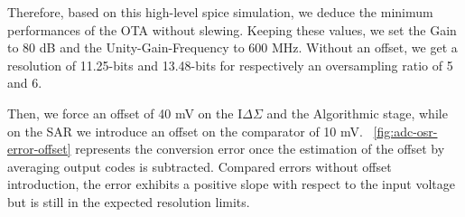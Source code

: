 Therefore, based on this high-level spice simulation, we deduce the minimum performances of the OTA without slewing. Keeping these values, we set the Gain to 80 dB and the Unity-Gain-Frequency to 600 MHz. Without an offset, we get a resolution of 11.25-bits and 13.48-bits for respectively an oversampling ratio of 5 and 6.

Then, we force an offset of 40 mV on the I\(\Delta\Sigma\) and the Algorithmic stage, while on the SAR we introduce an offset on the comparator of 10 mV. \figurename~\ref{fig:adc-osr-error-offset} represents the conversion error once the estimation of the offset by averaging output codes is subtracted. Compared errors without offset introduction, the error exhibits a positive slope with respect to the input voltage but is still in the expected resolution limits.


